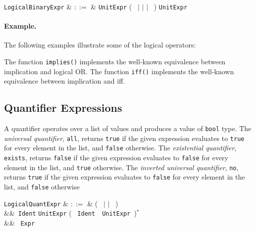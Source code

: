 \begin{syntax}

  \verb+LogicalBinaryExpr+ & $::=$ & \verb+UnitExpr+ \big(\ \token{<==>} $|$ \token{==>} $|$ \token{\&\&} $|$ \token{||}\ \big) \verb+UnitExpr+\\
\end{syntax}

\paragraph{Example.}  The following examples illustrate some of the logical operators:



The function \lstinline{implies()} implements the well-known equivalence between implication and logical OR.  The function \lstinline{iff()} implements the well-known equivalence between implication and iff.


\subsection{Quantifier Expressions}
\label{c_expr_quantifier}

A quantifier operates over a list of values and produces a value of \lstinline{bool} type.  The {\em universal quantifier}, \lstinline{all}, returns \lstinline{true} if the given expression evaluates to \lstinline{true} for every element in the list, and \lstinline{false} otherwise.  The {\em existential quantifier}, \lstinline{exists}, returns \lstinline{false} if the given expression evaluates to \lstinline{false} for every element in the list, and \lstinline{true} otherwise.  The {\em inverted universal quantifier}, \lstinline{no}, returns \lstinline{true} if the given expression evaluates to \lstinline{false} for every element in the list, and \lstinline{false} otherwise

\begin{syntax}
\verb+LogicalQuantExpr+ & $::=$ & \big(\  $|$  $|$
\ \big)\ \token{\{}\\
&&\ \verb+Ident+  \verb+UnitExpr+ \big( \token{,}\ \verb+Ident+\
\ \verb+UnitExpr+\ \big)$^*$\\
&&  \token{|}\ \verb+Expr+\ \token{\}}\\
\end{syntax}

